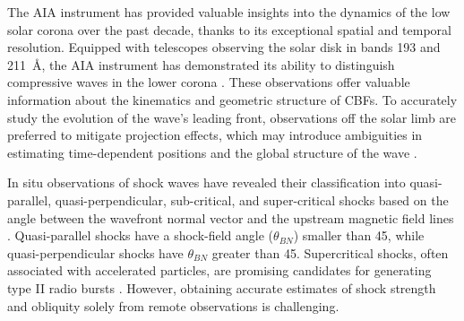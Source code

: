 The AIA instrument has provided valuable insights into the dynamics of the low solar corona over the past decade, thanks to its exceptional spatial and temporal resolution. Equipped with telescopes observing the solar disk in bands 193 and 211~\AA, the AIA instrument has demonstrated its ability to distinguish compressive waves in the lower corona \citep{patsourakos_2010, ma_2011, kozarev_2011}. These observations offer valuable information about the kinematics and geometric structure of CBFs. To accurately study the evolution of the wave's leading front, observations off the solar limb are preferred to mitigate projection effects, which may introduce ambiguities in estimating time-dependent positions and the global structure of the wave \citep{kozarev_2015}.

In situ observations of shock waves have revealed their classification into quasi-parallel, quasi-perpendicular, sub-critical, and super-critical shocks based on the angle between the wavefront normal vector and the upstream magnetic field lines \citep{tsurutani_1985}. Quasi-parallel shocks have a shock-field angle ($\theta_{BN}$) smaller than 45\degree, while quasi-perpendicular shocks have $\theta_{BN}$ greater than 45\degree. Supercritical shocks, often associated with accelerated particles, are promising candidates for generating type II radio bursts \citep{benz_1988}. However, obtaining accurate estimates of shock strength and obliquity solely from remote observations is challenging.


